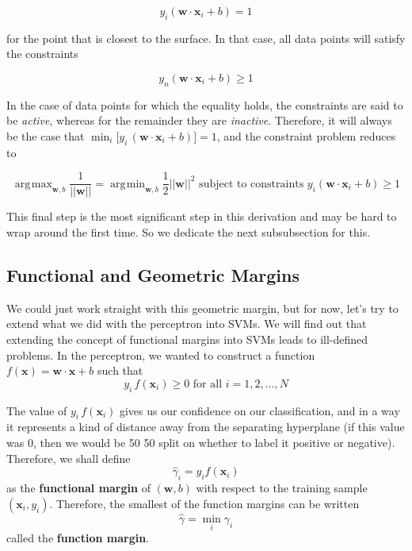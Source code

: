 \documentclass{article}
\DeclareMathOperator*{\argmin}{\arg\!\min}
\DeclareMathOperator*{\argmax}{\arg\!\max}
\begin{document}
    \begin{equation*}
      y_i ( \mathbf{w} \cdot \mathbf{x}_i + b ) = 1 
    \end{equation*}
    
    for the point that is closest to the surface. In that case, all data points will satisfy the constraints 

    \begin{equation*}
      y_n (\mathbf{w} \cdot \mathbf{x}_i + b) \geq 1
    \end{equation*}

    In the case of data points for which the equality holds, the constraints are said to be \textit{active}, whereas for the remainder they are \textit{inactive}. Therefore, it will always be the case that $\min_i \big[ y_i \, (\mathbf{w} \cdot \mathbf{x}_i + b)\big] = 1$, and the constraint problem reduces to 

    \begin{equation*}
      \argmax_{\mathbf{w}, b} \frac{1}{||\mathbf{w}||} = \argmin_{\mathbf{w}, b} \frac{1}{2} ||\mathbf{w}||^2 \text{ subject to constraints } y_i (\mathbf{w} \cdot \mathbf{x}_i + b) \geq 1 
    \end{equation*}

    This final step is the most significant step in this derivation and may be hard to wrap around the first time. So we dedicate the next subsubsection for this. 

    \subsection{Functional and Geometric Margins} 

    We could just work straight with this geometric margin, but for now, let's try to extend what we did with the perceptron into SVMs. We will find out that extending the concept of functional margins into SVMs leads to ill-defined problems. In the perceptron, we wanted to construct a function $f(\mathbf{x}) = \mathbf{w} \cdot \mathbf{x} + b$ such that 
    \begin{equation*}
      y_i \, f(\mathbf{x}_i) \geq 0 \text{ for all } i = 1, 2, \ldots, N
    \end{equation*}

    \begin{definition}
      The value of $y_i \, f(\mathbf{x}_i)$ gives us our confidence on our classification, and in a way it represents a kind of distance away from the separating hyperplane (if this value was $0$, then we would be 50 50 split on whether to label it positive or negative). Therefore, we shall define 
      \begin{equation*}
          \hat{\gamma}_i = y_i f(\mathbf{x}_i) 
      \end{equation*}
    as the \textbf{functional margin} of $(\mathbf{w}, b)$ with respect to the training sample $(\mathbf{x}_i, y_i)$. Therefore, the smallest of the function margins can be written 
    \begin{equation*}
        \hat{\gamma} = \min_i \gamma_i 
    \end{equation*}
    called the \textbf{function margin}. 
    \end{definition}
\end{document}
